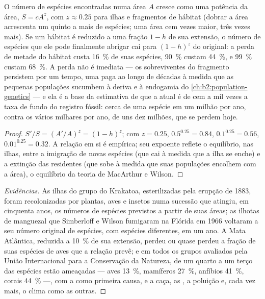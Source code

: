 \begin{theorem}\label{thm:b2:global-change:sar}
O número de espécies encontradas numa área $A$ cresce como uma potência
da área, $S = cA^{z}$, com $z \approx 0.25$ para ilhas e fragmentos de
hábitat (dobrar a área acrescenta um quinto a mais de espécies; uma área
cem vezes maior, três vezes mais). Se um hábitat é reduzido a uma
fração $1 - h$ de sua extensão, o número de espécies que ele pode
finalmente abrigar cai para $(1 - h)^{z}$ do original: a perda de
metade do hábitat custa \qty{16}{\%} de suas espécies,
\qty{90}{\%} custam \qty{44}{\%}, e \qty{99}{\%} custam
\qty{68}{\%}. A perda não é imediata --- os sobreviventes do fragmento
persistem por um tempo, uma \emph{} paga ao longo de
décadas à medida que as pequenas populações sucumbem à deriva e à
endogamia do \cref{ch:b2:population-genetics} --- e ela é a base da
estimativa de que a  atual é de cem a mil vezes a taxa
de fundo do registro fóssil: cerca de uma espécie em um milhão por ano,
contra os vários milhares por ano, de uns dez milhões, que se perdem
hoje.
\end{theorem}
\begin{proof}
$S'/S = (A'/A)^{z} = (1 - h)^{z}$; com $z = 0.25$, $0.5^{0.25} =
0.84$, $0.1^{0.25} = 0.56$, $0.01^{0.25} = 0.32$. A relação em si é
empírica; seu expoente reflete o equilíbrio, nas ilhas, entre a
imigração de novas espécies (que cai à medida que a ilha se enche) e a
extinção das residentes (que sobe à medida que suas populações encolhem
com a área), o equilíbrio da teoria de MacArthur e
Wilson.
\end{proof}
\begin{proof}[Evidências]
As ilhas do grupo do Krakatoa, esterilizadas pela erupção de 1883, foram
recolonizadas por plantas, aves e insetos numa sucessão que atingiu, em
cinquenta anos, os números de espécies previstos a partir de suas áreas;
as ilhotas de manguezal que Simberloff e Wilson fumigaram na Flórida em
1966 voltaram a seu número original de espécies, com espécies
diferentes, em um ano. A Mata Atlântica, reduzida a \qty{10}{\%} de sua
extensão, perdeu ou quase perdeu a fração de suas espécies de aves que a
relação prevê; e em todos os grupos avaliados pela União Internacional
para a Conservação da Natureza, de um quarto a um terço das espécies
estão ameaçadas --- aves \qty{13}{\%}, mamíferos \qty{27}{\%},
anfíbios \qty{41}{\%}, corais
\qty{44}{\%} ---, com a  como primeira causa, e a caça,
as , a poluição e, cada vez mais, o clima como as
outras.
\end{proof}

